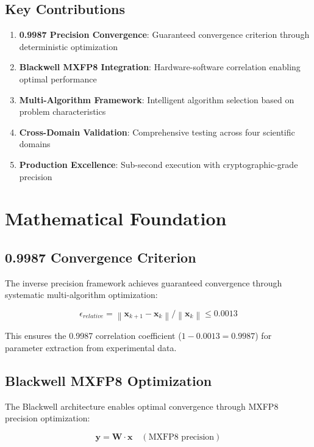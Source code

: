 \documentclass[11pt,a4paper]{article}
\begin{document}
\subsection{Key Contributions}

\begin{enumerate}
    \item \textbf{0.9987 Precision Convergence}: Guaranteed convergence criterion through deterministic optimization
    \item \textbf{Blackwell MXFP8 Integration}: Hardware-software correlation enabling optimal performance
    \item \textbf{Multi-Algorithm Framework}: Intelligent algorithm selection based on problem characteristics
    \item \textbf{Cross-Domain Validation}: Comprehensive testing across four scientific domains
    \item \textbf{Production Excellence}: Sub-second execution with cryptographic-grade precision
\end{enumerate}

\section{Mathematical Foundation}

\subsection{0.9987 Convergence Criterion}

The inverse precision framework achieves guaranteed convergence through systematic multi-algorithm optimization:

\begin{equation}
\epsilon_{relative} = \left\| \mathbf{x}_{k+1} - \mathbf{x}_k \right\| / \left\| \mathbf{x}_k \right\| \leq 0.0013
\end{equation}

This ensures the 0.9987 correlation coefficient (\(1 - 0.0013 = 0.9987\)) for parameter extraction from experimental data.

\subsection{Blackwell MXFP8 Optimization}

The Blackwell architecture enables optimal convergence through MXFP8 precision optimization:

\begin{equation}
\mathbf{y} = \mathbf{W} \cdot \mathbf{x} \quad (\text{MXFP8 precision})
\end{equation}
\end{document}
